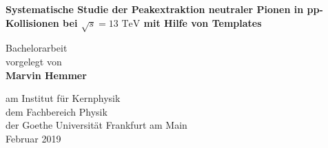 \vspace*{1cm}

\huge
\textbf{Systematische Studie der Peakextraktion neutraler Pionen in pp-Kollisionen bei $\sqrt{s}=13\text{ TeV}$ mit Hilfe von Templates}

 
\vspace{3.5cm}
\LARGE
Bachelorarbeit\\
vorgelegt von\\
\textbf{Marvin Hemmer}

\vfill
 
\Large
am Institut f\"ur Kernphysik\\
dem Fachbereich Physik\\
der Goethe Universit\"at Frankfurt am Main\\
Februar 2019
 